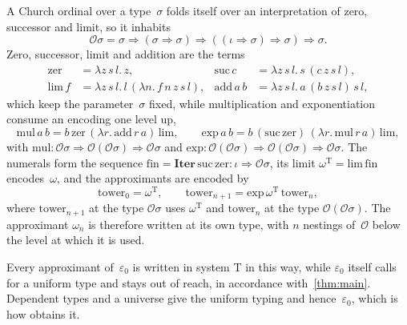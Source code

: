 \documentclass[11pt]{amsart}
\makeatletter
\newcommand{\Tm}{\mathrm{T}}
\newcommand{\gr}{\iota}                      %
\newcommand{\arr}{\Rightarrow}
\newcommand{\Iterc}{\mathbf{Iter}}
\newcommand{\eps}{\varepsilon_{0}}
\newcommand{\tower}[1]{\omega_{#1}}           %
\newif\ifagdarefs
\newcommand{\AgdaRefs}[1]{\ifagdarefs{\footnotesize\color{agdablue}(#1)}\else\unskip\fi}
\newcommand{\Agda}[2]{{\footnotesize\color{agdablue}\textsf{#1}%
  \ifblank{#2}{}{\texttt{.}\allowbreak\texttt{#2}}}}
\let\ttt@plain\texttt
\renewcommand{\texttt}[1]{{\footnotesize\color{agdablue}\ttt@plain{#1}}}
\theoremstyle{plain}
\theoremstyle{definition}
\makeatother
\begin{document}
\begin{definition}
\label{def:church}
A Church ordinal over a type~$\sigma$ folds itself over an
interpretation of zero, successor and limit, so it inhabits
\[
  \mathcal{O}\sigma = \sigma \arr (\sigma\arr\sigma)
    \arr ((\gr\arr\sigma)\arr\sigma) \arr \sigma .
\]
Zero, successor, limit and addition are the terms
\begin{align*}
  \mathrm{zer} &= \lambda z\,s\,l.\,z , &
  \mathrm{suc}\,c &= \lambda z\,s\,l.\,s\,(c\,z\,s\,l) , \\
  \mathrm{lim}\,f &= \lambda z\,s\,l.\,l\,(\lambda n.\,f\,n\,z\,s\,l) , &
  \mathrm{add}\,a\,b &= \lambda z\,s\,l.\,a\,(b\,z\,s\,l)\,s\,l ,
\end{align*}
which keep the parameter~$\sigma$ fixed, while multiplication and
exponentiation consume an encoding one level up,
\[
  \mathrm{mul}\,a\,b
    = b\,\mathrm{zer}\,(\lambda r.\,\mathrm{add}\,r\,a)\,\mathrm{lim} ,
  \qquad
  \mathrm{exp}\,a\,b
    = b\,(\mathrm{suc}\,\mathrm{zer})\,(\lambda r.\,\mathrm{mul}\,r\,a)
      \,\mathrm{lim} ,
\]
with $\mathrm{mul} : \mathcal{O}\sigma \arr \mathcal{O}(\mathcal{O}\sigma)
 \arr \mathcal{O}\sigma$ and
$\mathrm{exp} : \mathcal{O}(\mathcal{O}\sigma) \arr
 \mathcal{O}(\mathcal{O}\sigma) \arr \mathcal{O}\sigma$. The numerals
form the sequence
$\mathrm{fin} = \Iterc\,\mathrm{suc}\,\mathrm{zer} :
 \gr \arr \mathcal{O}\sigma$, its limit
$\omega^{\Tm} = \mathrm{lim}\,\mathrm{fin}$ encodes~$\omega$, and the
approximants are encoded by
\[
  \mathrm{tower}_0 = \omega^{\Tm} , \qquad
  \mathrm{tower}_{n+1} = \mathrm{exp}\,\omega^{\Tm}\,\mathrm{tower}_n ,
\]
where $\mathrm{tower}_{n+1}$ at the type $\mathcal{O}\sigma$ uses
$\omega^{\Tm}$ and $\mathrm{tower}_n$ at the type
$\mathcal{O}(\mathcal{O}\sigma)$. The approximant $\tower n$ is
therefore written at its own type, with $n$ nestings
of~$\mathcal{O}$ below the level at which it is used.
\AgdaRefs{\Agda{DialogueTrees.Sharpness}{𝓞}; \texttt{zerᵀ},
\texttt{sucᵀ}, \texttt{limᵀ}, \texttt{addᵀ}, \texttt{mulᵀ},
\texttt{expᵀ}, \texttt{finᵀ}, \texttt{ωᵀ}, \texttt{towerᵀ};
\Agda{Ordinals.ChurchEncoding}{O}.}
\end{definition}

\begin{remark}
\label{rem:no-eps}
Every approximant of~$\eps$ is written in system T in this way, while
$\eps$ itself calls for a uniform type and stays out of reach, in
accordance with~\cref{thm:main}. Dependent types and a universe give
the uniform typing and hence~$\eps$, which is how
\cite{CoquandHancockSetzer1997} obtains it.
\end{remark}
\end{document}
